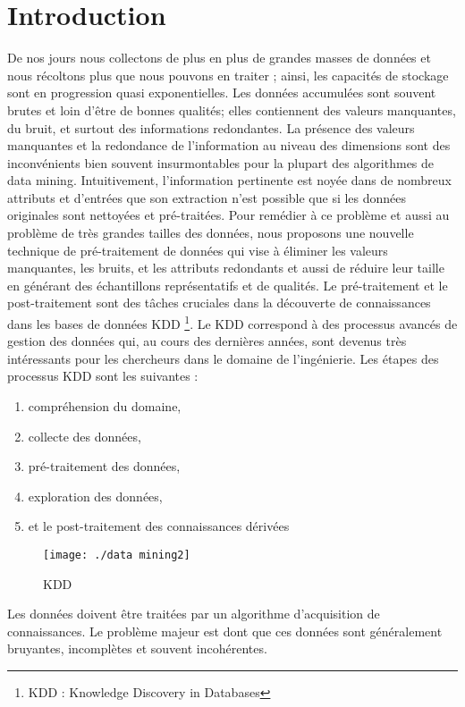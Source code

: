 \documentclass[a4paper, 12pt]{article}
\begin{document}
	\section{Introduction} De nos jours nous collectons de plus en plus de grandes
	masses de données et nous récoltons plus que nous pouvons en
	traiter ; ainsi, les capacités de stockage sont en progression
	quasi exponentielles. Les données accumulées sont souvent
	brutes et loin d’être de bonnes qualités; elles contiennent des
	valeurs manquantes, du bruit, et surtout des informations
	redondantes.
	La présence des valeurs manquantes et la redondance de
	l’information au niveau des dimensions sont des inconvénients
	bien souvent insurmontables pour la plupart des algorithmes
	de data mining. Intuitivement, l’information pertinente est
	noyée dans de nombreux attributs et d’entrées que son
	extraction n’est possible que si les données originales sont
	nettoyées et pré-traitées.
	Pour remédier à ce problème et aussi au problème de très
	grandes tailles des données, nous proposons une nouvelle
	technique de pré-traitement de données qui vise à éliminer les
	valeurs manquantes, les bruits, et les attributs redondants et
	aussi de réduire leur taille en générant des échantillons
	représentatifs et de qualités.
	Le pré-traitement et le post-traitement sont des tâches cruciales dans la découverte de connaissances dans les bases de données KDD \footnote{KDD : Knowledge Discovery in Databases}. 
	Le KDD correspond à des processus avancés de gestion des données qui, au cours des dernières années, sont devenus très intéressants pour les chercheurs dans le domaine de l'ingénierie. 
	Les étapes des processus KDD sont les suivantes :
	\begin{enumerate}
		\item compréhension du domaine, 	
		\item collecte des données,
		\item pré-traitement des données, 
		\item exploration des données,
		\item et le post-traitement des connaissances dérivées
	\end{enumerate}
	
	\begin{figure}[h]
		\centering
		\texttt{[image: ./data mining2]}
		\caption{KDD}
	\end{figure}
	Les données doivent être traitées par un algorithme d'acquisition de connaissances. Le problème majeur est dont que ces données sont généralement bruyantes, incomplètes et souvent incohérentes. 
\end{document}
